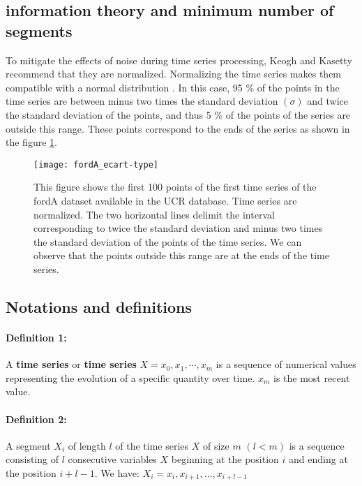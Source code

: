 \subsection{information theory and minimum number of segments}
To mitigate the effects of noise during time series processing, Keogh and Kasetty \cite{KeoghBenchmarks} recommend that they are normalized. Normalizing the time series makes them compatible with a normal distribution \cite{Lin2007}. In this case, 95 \% of the points in the time series are between minus two times the standard deviation $ (\sigma) $ and twice the standard deviation of the points, and thus 5 \% of the points of the series are outside this range. These points correspond to the ends of the series as shown in the figure \ref{standard_deviation}.


\begin{figure}
\centering
\texttt{[image: fordA\_ecart-type]}
\caption{This figure shows the first 100 points of the first time series  of the fordA dataset available in the UCR \cite{UCRArchive} database. Time series are normalized. The two horizontal lines delimit the interval corresponding to twice the standard deviation and minus two times the standard deviation of the points of the time series. We can observe that the points outside this range are at the ends of the time series.}
\label{standard_deviation} 
\end{figure}



\subsection{Notations and definitions}
\paragraph{Definition 1:} A \textbf{time series} or \textbf{time series}
$ X = x_{0}, x_{1}, \cdots, x_{m} $ is a sequence of numerical values representing the evolution of a specific quantity over time. $ x_{m} $ is the most recent value.

\paragraph{Definition 2:} A segment $ X_{i} $ of length $ l $ of the time series
$ X $ of size $ m $ $ (l <m) $ is a sequence consisting of $ l $ consecutive variables
$ X $ beginning at the  position  $ i $  and ending at the position $ i + l-1 $.
We have: $ X_{i} = x_{i}, x_{i + 1}, ..., x_{i + l-1} $

